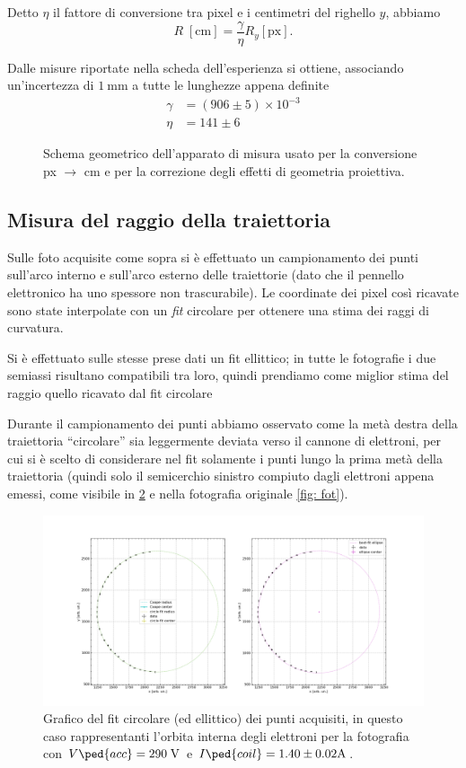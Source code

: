 \documentclass[10pt, a4paper, italian]{article}
\begin{document}
Detto $\eta$ il fattore di conversione tra pixel e i centimetri del righello
$y$, abbiamo
\[
R \; [\si{\centi\meter}] = \frac{\gamma}{\eta} R_y [\mathrm{px}]
.\]

Dalle misure riportate nella scheda dell'esperienza si ottiene, associando
un'incertezza di $\SI{1}{\milli\meter}$ a tutte le lunghezze appena definite
\begin{align*}
\gamma &= (906 \pm 5) \times 10^{-3} \\ 
\eta &= 141 \pm 6
\end{align*}

\begin{figure}[htbp]
    \centering
    
    \caption{\label{fig: conversione} Schema geometrico dell'apparato di
    misura usato per la conversione px $\to$ cm e per la correzione
    degli effetti di geometria proiettiva.}
\end{figure}

\subsection{Misura del raggio della traiettoria}
Sulle foto acquisite come sopra si è effettuato un campionamento dei punti
sull'arco interno e sull'arco esterno delle traiettorie (dato che il pennello
elettronico ha uno spessore non trascurabile). Le coordinate dei pixel così
ricavate sono state interpolate con un \emph{fit} circolare per ottenere una
stima dei raggi di curvatura.

Si è effettuato sulle stesse prese dati un fit ellittico; in tutte le
fotografie i due semiassi risultano compatibili tra loro, quindi
prendiamo come miglior stima del raggio quello ricavato dal fit circolare

Durante il campionamento dei punti abbiamo osservato come la metà destra
della traiettoria ``circolare'' sia leggermente deviata verso il cannone
di elettroni, per cui si è scelto di considerare nel fit solamente i punti
lungo la prima metà della traiettoria (quindi solo il semicerchio sinistro
compiuto dagli elettroni appena emessi, come visibile in \cref{fig: circfit}
e nella fotografia originale \cref{fig: fot}).
\begin{figure}[htbp]
\includegraphics[width=\textwidth]{circfit}
\caption{Grafico del fit circolare (ed ellittico) dei punti acquisiti, in
questo caso rappresentanti l'orbita interna degli elettroni per la fotografia
con $V\ped{acc} = 290 \; \si{V}$ e $I\ped{coil} = 1.40 \pm 0.02 \si{A}$.
\label{fig: circfit}}
\end{figure}
\end{document}
